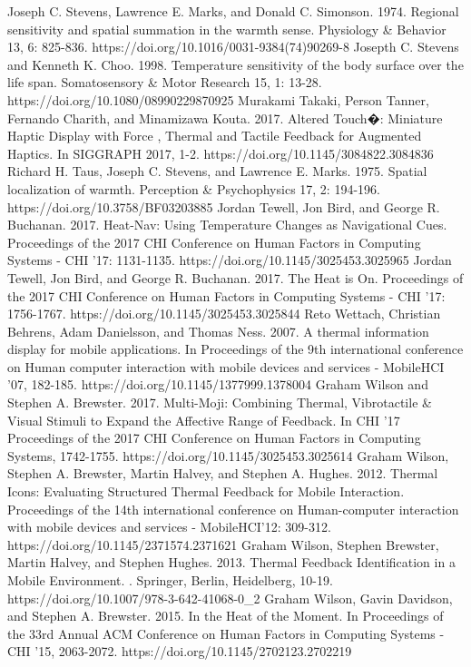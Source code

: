 \documentclass[preprint,12pt]{elsarticle}
\begin{document}
\begin{thebibliography}{00}
Joseph C. Stevens, Lawrence E. Marks, and Donald C. Simonson. 1974. Regional sensitivity and spatial summation in the warmth sense. Physiology \& Behavior 13, 6: 825-836. https://doi.org/10.1016/0031-9384(74)90269-8
Josepth C. Stevens and Kenneth K. Choo. 1998. Temperature sensitivity of the body surface over the life span. Somatosensory \& Motor Research 15, 1: 13-28. https://doi.org/10.1080/08990229870925
Murakami Takaki, Person Tanner, Fernando Charith, and Minamizawa Kouta. 2017. Altered Touch�: Miniature Haptic Display with Force , Thermal and Tactile Feedback for Augmented Haptics. In SIGGRAPH 2017, 1-2. https://doi.org/10.1145/3084822.3084836
Richard H. Taus, Joseph C. Stevens, and Lawrence E. Marks. 1975. Spatial localization of warmth. Perception \& Psychophysics 17, 2: 194-196. https://doi.org/10.3758/BF03203885
Jordan Tewell, Jon Bird, and George R. Buchanan. 2017. Heat-Nav: Using Temperature Changes as Navigational Cues. Proceedings of the 2017 CHI Conference on Human Factors in Computing Systems - CHI '17: 1131-1135. https://doi.org/10.1145/3025453.3025965
Jordan Tewell, Jon Bird, and George R. Buchanan. 2017. The Heat is On. Proceedings of the 2017 CHI Conference on Human Factors in Computing Systems - CHI '17: 1756-1767. https://doi.org/10.1145/3025453.3025844
Reto Wettach, Christian Behrens, Adam Danielsson, and Thomas Ness. 2007. A thermal information display for mobile applications. In Proceedings of the 9th international conference on Human computer interaction with mobile devices and services - MobileHCI '07, 182-185. https://doi.org/10.1145/1377999.1378004
Graham Wilson and Stephen A. Brewster. 2017. Multi-Moji: Combining Thermal, Vibrotactile \& Visual Stimuli to Expand the Affective Range of Feedback. In CHI '17 Proceedings of the 2017 CHI Conference on Human Factors in Computing Systems, 1742-1755. https://doi.org/10.1145/3025453.3025614
Graham Wilson, Stephen A. Brewster, Martin Halvey, and Stephen A. Hughes. 2012. Thermal Icons: Evaluating Structured Thermal Feedback for Mobile Interaction. Proceedings of the 14th international conference on Human-computer interaction with mobile devices and services - MobileHCI'12: 309-312. https://doi.org/10.1145/2371574.2371621
Graham Wilson, Stephen Brewster, Martin Halvey, and Stephen Hughes. 2013. Thermal Feedback Identification in a Mobile Environment. . Springer, Berlin, Heidelberg, 10-19. https://doi.org/10.1007/978-3-642-41068-0\_2
Graham Wilson, Gavin Davidson, and Stephen A. Brewster. 2015. In the Heat of the Moment. In Proceedings of the 33rd Annual ACM Conference on Human Factors in Computing Systems - CHI '15, 2063-2072. https://doi.org/10.1145/2702123.2702219

\end{thebibliography}
\end{document}
